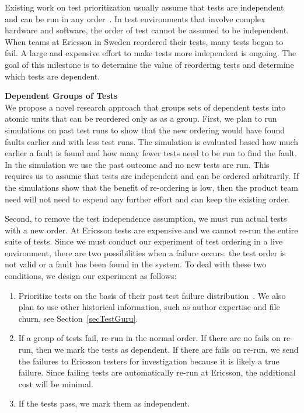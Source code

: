 Existing work on test prioritization usually assume that tests are independent and can be run in any order~\cite{Marijan2013ICSM,Elbaum2014FSE,Hemmati2015ICVV}. In test environments that involve complex hardware and software, the order of test cannot be assumed to be independent. When teams at Ericsson in Sweden reordered their tests, many tests began to fail. A large and expensive effort to make tests more independent is ongoing. The goal of this milestone is to determine the value of reordering tests and determine which tests are dependent.

\textbf{Dependent Groups of Tests}\\
We propose a novel research approach that groups sets of dependent tests into atomic units that can be reordered only as as a group. 
%
First, we plan to run simulations on past test runs to show that the new ordering would have found faults earlier and with less test runs. The simulation is evaluated based how much earlier a fault is found and how many fewer tests need to be run to find the fault. 
%
In the simulation we use the past outcome and no new tests are run. This requires us to assume that tests are independent and can be ordered arbitrarily. If the simulations show that the benefit of re-ordering is low, then the product team need will not need to expend any further effort and can keep the existing order.

Second, to remove the test independence assumption, we must run actual tests with a new order. At Ericsson tests are expensive and we cannot re-run the entire suite of tests. 
%
Since we must conduct our experiment of test ordering in a live environment, there are two possibilities when a failure occurs: the test order is not valid or a fault has been found in the system. To deal with these two conditions, we design our experiment as follows:

\begin{enumerate}

\item Prioritize tests on the basis of their past test failure distribution~\cite{Kim2002ICSE,Hemmati}. We also plan to use other historical information, such as author expertise and file churn, see Section~\ref{secTestGuru}.

\item If a group of tests fail, re-run in the normal order. If there are no fails on re-run, then we mark the tests as dependent. If there are fails on re-run, we send the failures to Ericsson testers for investigation because it is likely a true failure. Since failing tests are automatically re-run at Ericsson, the additional cost will be minimal.
 
\item If the tests pass, we mark them as independent.

\end{enumerate}

